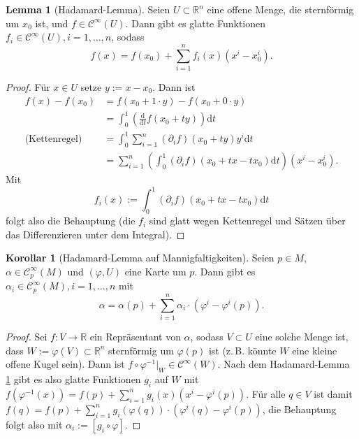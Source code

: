 \documentclass[a4paper]{scrreprt}
\numberwithin{equation}{chapter}
\newcommand{\D}{\mathrm{d}}
\newcommand{\sC}{\mathcal{C}^{\infty}}
\theoremstyle{definition}
\newtheorem{lemma}[defn]{Lemma}
\newtheorem{kor}[defn]{Korollar}
\begin{document}
\begin{lemma}[Hadamard-Lemma] \label{lemma:Hadamard}
	Seien $U \subset \mathbb R^n$ eine offene Menge, die sternförmig um $x_0$ ist, und $f \in \sC(U)$. Dann gibt es glatte Funktionen $f_i \in \sC(U), i = 1,\dots,n$, sodass \[f(x) = f(x_0) + \sum_{i=1}^n f_i(x) (x^i - x_0^i).\]

	\begin{proof}
		Für $x \in U$ setze $y := x - x_0$. Dann ist
		\begin{align*}
			f(x) - f(x_0) &= f(x_0 + 1\cdot y) - f(x_0 + 0\cdot y)\\
			&= \int_0^1 \left(\frac{\D}{\D t} f(x_0 + ty)\right) \D t\\
			\text{(Kettenregel)} \quad &= \int_0^1 \sum_{i=1}^n (\partial_i f)(x_0 + ty) y^i \D t\\
			&= \sum_{i=1}^n \left(\int_0^1 (\partial_i f)(x_0 + tx - tx_0) \D t\right) (x^i - x_0^i).
		\end{align*}
		Mit \[f_i(x) := \int_0^1 (\partial_i f)(x_0 + tx - tx_0) \D t\] folgt also die Behauptung (die $f_i$ sind glatt wegen Kettenregel und Sätzen über das Differenzieren unter dem Integral).
	\end{proof}
\end{lemma}

\begin{kor}[Hadamard-Lemma auf Mannigfaltigkeiten]
	Seien $p\in M$, $\alpha \in \sC_p(M)$ und $(\varphi,U)$ eine Karte um $p$. Dann gibt es $\alpha_i \in \sC_p(M), i = 1,\dots, n$ mit \[\alpha = \alpha(p) + \sum_{i=1}^n \alpha_i \cdot (\varphi^i - \varphi^i(p)).\]

	\begin{proof}
		Sei $f\colon V \to \mathbb R$ ein Repräsentant von $\alpha$, sodass $V \subset U$ eine solche Menge ist, dass $W := \varphi(V) \subset \mathbb R^n$ sternförmig um $\varphi(p)$ ist (z.\,B. könnte $W$ eine kleine offene Kugel sein). Dann ist $f\circ\varphi^{-1}|_W \in \sC(W)$. Nach dem Hadamard-Lemma \ref{lemma:Hadamard} gibt es also glatte Funktionen $g_i$ auf $W$ mit $f(\varphi^{-1}(x)) = f(p) + \sum_{i=1}^n g_i(x) (x^i - \varphi^i(p))$. Für alle $q \in V$ ist damit $f(q) = f(p) + \sum_{i=1}^n g_i(\varphi(q)) \cdot (\varphi^i(q) - \varphi^i(p))$, die Behauptung folgt also mit $\alpha_i := [g_i \circ \varphi]$.
	\end{proof}
\end{kor}
\end{document}
